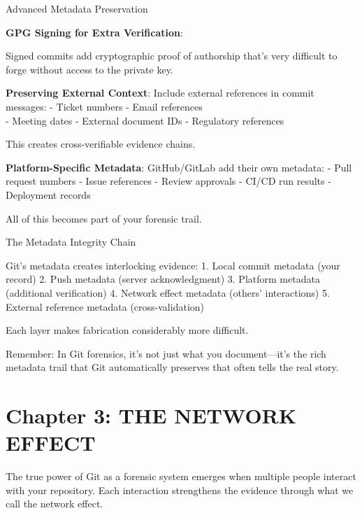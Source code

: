 Advanced Metadata Preservation

\textbf{GPG Signing for Extra Verification}:

\begin{Shaded}
\begin{Highlighting}[]
  
\end{Highlighting}
\end{Shaded}

Signed commits add cryptographic proof of authorship that's very
difficult to forge without access to the private key.

\textbf{Preserving External Context}: Include external references in
commit messages: - Ticket numbers - Email references\\
- Meeting dates - External document IDs - Regulatory references

This creates cross-verifiable evidence chains.

\textbf{Platform-Specific Metadata}: GitHub/GitLab add their own
metadata: - Pull request numbers - Issue references - Review approvals -
CI/CD run results - Deployment records

All of this becomes part of your forensic trail.

The Metadata Integrity Chain

Git's metadata creates interlocking evidence: 1. Local commit metadata
(your record) 2. Push metadata (server acknowledgment) 3. Platform
metadata (additional verification) 4. Network effect metadata (others'
interactions) 5. External reference metadata (cross-validation)

Each layer makes fabrication considerably more difficult.

Remember: In Git forensics, it's not just what you document---it's the
rich metadata trail that Git automatically preserves that often tells
the real story.

\section{Chapter 3: THE NETWORK
EFFECT}\label{chapter-3-the-network-effect}

The true power of Git as a forensic system emerges when multiple people
interact with your repository. Each interaction strengthens the evidence
through what we call the network effect.

